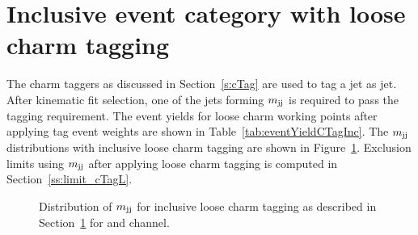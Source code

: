\section{Inclusive event category with loose charm tagging}
\label{ss:mjj_cTagL}
The charm taggers as discussed in Section~\ref{s:cTag} are used to tag a jet 
as \PQc jet. After kinematic fit selection, one of the jets forming $m_\text{jj}$ is 
required to pass the \PQc tagging requirement. The event yields for loose charm 
working points after applying \PQc tag event weights are shown in Table~\ref{tab:eventYieldCTagInc}. 
The $m_\text{jj}$ distributions with inclusive loose charm tagging are 
shown in Figure~\ref{fig:mjj_cTagL}. Exclusion limits using $m_\text{jj}$ after 
applying loose charm tagging is computed in Section~\ref{ss:limit_cTagL}.
\begin{figure}
\centering  
{}
\caption{Distribution of $m_\text{jj}$ for inclusive loose charm tagging as
described in Section~\ref{ss:mjj_cTagL} for \mujets and \ejets channel.}
\label{fig:mjj_cTagL}
\end{figure}

